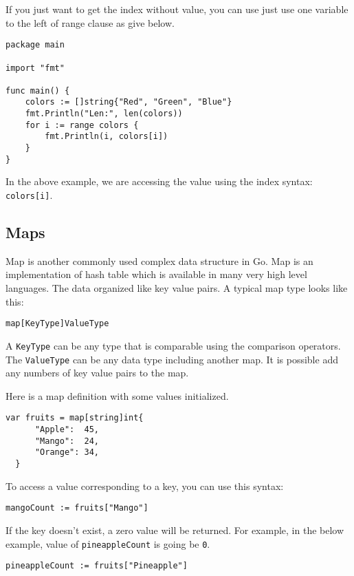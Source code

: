 If you just want to get the index without value, you can use just use
one variable to the left of range clause as give below.

\begin{lstlisting}[caption=Range loop without index]
package main

import "fmt"

func main() {
    colors := []string{"Red", "Green", "Blue"}
    fmt.Println("Len:", len(colors))
    for i := range colors {
        fmt.Println(i, colors[i])
    }
}
\end{lstlisting}

In the above example, we are accessing the value using the index
syntax: \texttt{colors[i]}.

\subsection{Maps}

Map is another commonly used complex data structure in Go.
Map is an implementation of hash table which is available in many very
high level languages.  The data organized like key value pairs.  A
typical map type looks like this:

\begin{lstlisting}[numbers=none]
map[KeyType]ValueType
\end{lstlisting}

A \texttt{KeyType} can be any type that is comparable using the
comparison operators.  The \texttt{ValueType} can be any data type
including another map.  It is possible add any numbers of key value
pairs to the map.

Here is a map definition with some values initialized.

\begin{lstlisting}[numbers=none]
var fruits = map[string]int{
      "Apple":  45,
      "Mango":  24,
      "Orange": 34,
  }
\end{lstlisting}

To access a value corresponding to a key, you can use this syntax:

\begin{lstlisting}[numbers=none]
mangoCount := fruits["Mango"]
\end{lstlisting}

If the key doesn't exist, a zero value will be returned. For example, in the
below example, value of \texttt{pineappleCount} is going be \texttt{0}.

\begin{lstlisting}[numbers=none]
pineappleCount := fruits["Pineapple"]
\end{lstlisting}

